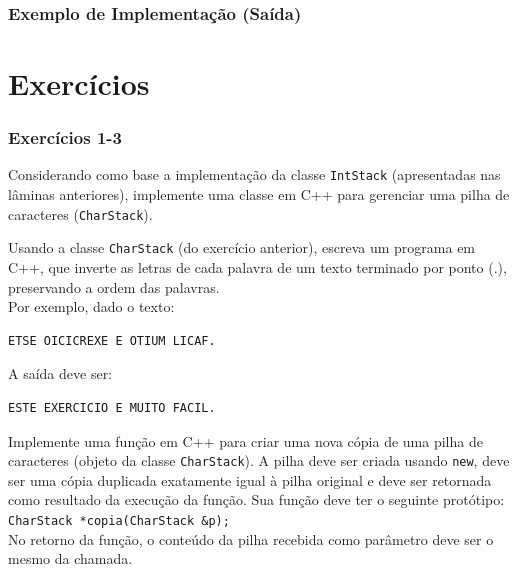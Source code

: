 \documentclass[aspectratio=169]{beamer}
\begin{document}
\begin{frame}\frametitle{Exemplo de Implementação (Saída)}

\end{frame}

\section{Exercícios}

\begin{frame}[fragile]\frametitle{Exercícios 1-3}
\begin{enumerate}
{\small
	\item Considerando como base a implementação da classe \texttt{IntStack} (apresentadas nas lâminas anteriores), implemente uma classe em C++ para gerenciar uma pilha de caracteres (\texttt{CharStack}).\\

	\item Usando a classe \texttt{CharStack} (do exercício anterior), escreva um programa em C++, que inverte as letras de cada palavra de um texto terminado por ponto (.), preservando a ordem das palavras.\\
Por exemplo, dado o texto:\\
\begin{verbatim}
ETSE OICICREXE E OTIUM LICAF.
\end{verbatim}
A saída deve ser:
\begin{verbatim}
ESTE EXERCICIO E MUITO FACIL.
\end{verbatim}

\item Implemente uma função em C++ para criar uma nova cópia de uma pilha de caracteres (objeto da classe \texttt{CharStack}). A pilha deve ser criada usando \texttt{new}, deve ser uma cópia duplicada exatamente igual à pilha original e deve ser retornada como resultado da execução da função. Sua função deve ter o seguinte protótipo:\\
\texttt{CharStack *copia(CharStack \&p);}\\
No retorno da função, o conteúdo da pilha recebida como parâmetro deve ser o mesmo da chamada.\\
}
\end{enumerate}
\end{frame}
\end{document}
